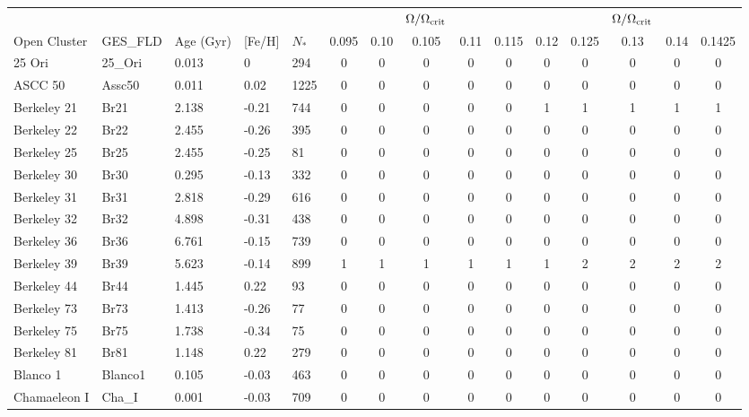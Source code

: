 \documentclass[fleqn,usenatbib]{mnras}
\begin{document}
\begin{table}
	\centering
	\begin{tabular}{|l l l l l || c c c c c | c c c c c|} 
		\hline
             & & & & & & & $\Omega / \Omega_{\mathrm{crit}}$ & & & & & $\Omega / \Omega_{\mathrm{crit}}$ & & \\
		Open Cluster & GES\_FLD & Age (Gyr) & [Fe/H] & $N_*$ & 0.095 & 0.10 & 0.105 & 0.11 & 0.115 & 0.12 & 0.125 & 0.13 & 0.14 & 0.1425\\
		\hline
            25 Ori & 25\_Ori & 0.013 & 0 & 294 & 0 & 0 & 0 & 0 & 0 & 0 & 0 & 0 & 0 & 0\\
            ASCC 50 & Assc50 & 0.011 & 0.02 & 1225 & 0 & 0 & 0 & 0 & 0 & 0 & 0 & 0 & 0 & 0\\
            \rowcolor{lightgray}
            Berkeley 21 & Br21 & 2.138 & -0.21 & 744 & 0 & 0 & 0 & 0 & 0 & 1 & 1 & 1 & 1 & 1\\
            Berkeley 22 & Br22 & 2.455 & -0.26 & 395 & 0 & 0 & 0 & 0 & 0 & 0 & 0 & 0 & 0 & 0\\
            Berkeley 25 & Br25 & 2.455 & -0.25 & 81 & 0 & 0 & 0 & 0 & 0 & 0 & 0 & 0 & 0 & 0\\
            Berkeley 30 & Br30 & 0.295 & -0.13 & 332 & 0 & 0 & 0 & 0 & 0 & 0 & 0 & 0 & 0 & 0\\
            Berkeley 31 & Br31 & 2.818 & -0.29 & 616 & 0 & 0 & 0 & 0 & 0 & 0 & 0 & 0 & 0 & 0\\
            Berkeley 32 & Br32 & 4.898 & -0.31 & 438 & 0 & 0 & 0 & 0 & 0 & 0 & 0 & 0 & 0 & 0\\
            Berkeley 36 & Br36 & 6.761 & -0.15 & 739 & 0 & 0 & 0 & 0 & 0 & 0 & 0 & 0 & 0 & 0\\
            \rowcolor{lightgray}
            Berkeley 39 & Br39 & 5.623 & -0.14 & 899 & 1 & 1 & 1 & 1 & 1 & 1 & 2 & 2 & 2 & 2\\
            Berkeley 44 & Br44 & 1.445 & 0.22 & 93 & 0 & 0 & 0 & 0 & 0 & 0 & 0 & 0 & 0 & 0\\
            Berkeley 73 & Br73 & 1.413 & -0.26 & 77 & 0 & 0 & 0 & 0 & 0 & 0 & 0 & 0 & 0 & 0\\
            Berkeley 75 & Br75 & 1.738 & -0.34 & 75 & 0 & 0 & 0 & 0 & 0 & 0 & 0 & 0 & 0 & 0\\
            Berkeley 81 & Br81 & 1.148 & 0.22 & 279 & 0 & 0 & 0 & 0 & 0 & 0 & 0 & 0 & 0 & 0\\
            Blanco 1 & Blanco1 & 0.105 & -0.03 & 463 & 0 & 0 & 0 & 0 & 0 & 0 & 0 & 0 & 0 & 0\\
            Chamaeleon I & Cha\_I & 0.001 & -0.03 & 709 & 0 & 0 & 0 & 0 & 0 & 0 & 0 & 0 & 0 & 0\\

\end{tabular}
\end{table}
\end{document}
